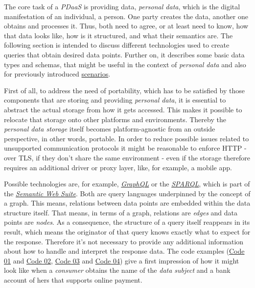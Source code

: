 \documentclass[12pt,english,a4paper,titlepage,cleardoublepage=empty,dottedtoc]{report}
\begin{document}
The core task of a \emph{PDaaS} is providing data, \emph{personal data},
which is the digital manifestation of an individual, a person. One party
creates the data, another one obtains and processes it. Thus, both need
to agree, or at least need to know, how that data looks like, how is it
structured, and what their semantics are. The following section is
intended to discuss different technologies used to create queries that
obtain desired data points. Further on, it describes some basic data
types and schemas, that might be useful in the context of \emph{personal
data} and also for previously introduced
\protect\hyperlink{scenarios}{scenarios}.

First of all, to address the need of portability, which has to be
satisfied by those components that are storing and providing
\emph{personal data}, it is essential to abstract the actual storage
from how it gets accessed. This makes it possible to relocate that
storage onto other platforms and environments. Thereby the
\emph{personal data storage} itself becomes platform-agnostic from an
outside perspective, in other words, portable. In order to reduce
possible issues related to unsupported communication protocols it might
be reasonable to enforce HTTP - over TLS, if they don't share the same
environment - even if the storage therefore requires an additional
driver or proxy layer, like, for example, a mobile app.

Possible technologies are, for example,
\emph{\protect\hyperlink{def--graphql}{GraphQL}} or the
\emph{\protect\hyperlink{def--sparql}{SPARQL}}, which is part of the
\emph{\protect\hyperlink{def--semantic-web}{Semantic Web Suite}}. Both
are query languages underpinned by the concept of a graph. This means,
relations between data points are embedded within the data structure
itself. That means, in terms of a graph, relations are \emph{edges} and
data points are \emph{nodes}. As a consequence, the structure of a query
itself reappears in its result, which means the originator of that query
knows exactly what to expect for the response. Therefore it's not
necessary to provide any additional information about how to handle and
interpret the response data. The code examples
(\protect\hyperlink{code-01_sparql-query}{Code 01} and
\protect\hyperlink{code-02_sparql-query-results}{Code 02},
\protect\hyperlink{code-03_graphql-query}{Code 03} and
\protect\hyperlink{code-04_graphql-query-result}{Code 04}) give a first
impression of how it might look like when a \emph{consumer} obtains the
name of the \emph{data subject} and a bank account of hers that supports
online payment.
\end{document}
